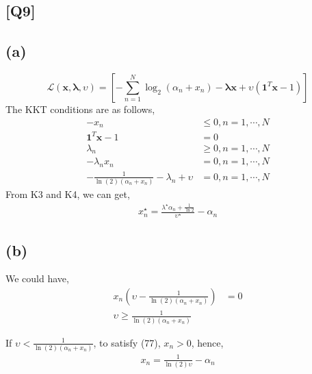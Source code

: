 \documentclass[12pt, a4 paper]{article}
\begin{document}
    \begin{framed}
        \section{[Q9]}
        \subsection{(a)}
        $$
        \mathcal{L}(\boldsymbol{x}, \boldsymbol{\lambda}, \upsilon) = \left[ 
            -\sum\limits_{n=1}^{N} \log_{2}(\alpha_{n}+x_{n}) - \boldsymbol{\lambda}
            \boldsymbol{x} + \upsilon(\mathbf{1}^{T} \boldsymbol{x}-1)
        \right]
        $$
        \indent The KKT conditions are as follows,
        \begin{align}
            -x_{n} &\leq 0, n=1,\cdots, N\\
            \mathbf{1}^{T}\boldsymbol{x} - 1 &= 0\\
            \lambda_{n} &\geq 0, n=1,\cdots, N\\
            -\lambda_{n}x_{n} &= 0, n=1, \cdots, N\\
            -\frac{1}{\ln(2)(\alpha_{n} + x_{n})} - \lambda_{n} + \upsilon &= 0, n=1,
            \cdots, N
        \end{align}
        \indent From K3 and K4, we can get,
        \begin{align}
            x_{n}^{\star} = \frac{\lambda^{\star} \alpha_{n} + \frac{1}{\ln2}}
            {\upsilon^{\star}} - \alpha_{n}
        \end{align}

        \subsection{(b)}
        We could have,
        \begin{align}
            x_{n} \left( \upsilon  - \frac{1}{\ln(2) (\alpha_{n}
            +x_{n})} \right) &= 0\\
            \upsilon \geq \frac{1}{\ln(2) (\alpha_{n}+ x_{n})}
        \end{align}

        If $\upsilon < \frac{1}{\ln(2) (\alpha_{n} + x_{n})}$, to
        satisfy (77), $x_{n} >0$, hence,
        \begin{align}
            x_{n} = \frac{1}{\ln(2) \upsilon} - \alpha_{n}
        \end{align}


\end{framed}
\end{document}
